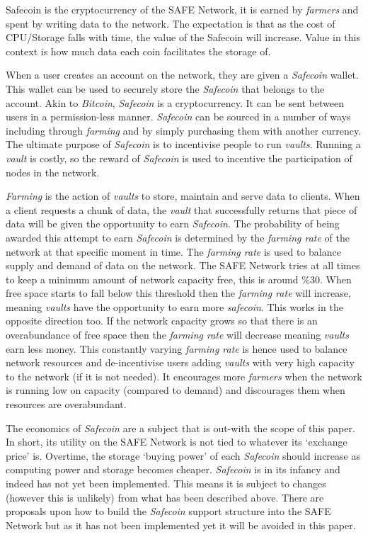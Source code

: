 Safecoin\cite{lambert2015safecoin} is the cryptocurrency of the SAFE Network, it is earned by \textit{farmers} and spent by writing data to the network. The expectation is that as the cost of CPU/Storage falls with time, the value of the Safecoin will increase. Value in this context is how much data each coin facilitates the storage of.

When a user creates an account on the network, they are given a \textit{Safecoin} wallet. This wallet can be used to securely store the \textit{Safecoin} that belongs to the account. Akin to \textit{Bitcoin}, \textit{Safecoin} is a cryptocurrency. It can be sent between users in a permission-less manner. \textit{Safecoin} can be sourced in a number of ways including through \textit{farming} and by simply purchasing them with another currency. The ultimate purpose of \textit{Safecoin} is to incentivise people to run \textit{vaults}. Running a \textit{vault} is costly, so the reward of \textit{Safecoin} is used to incentive the participation of nodes in the network.

\textit{Farming} is the action of \textit{vaults} to store, maintain and serve data to clients. When a client requests a chunk of data, the \textit{vault} that successfully returns that piece of data will be given the opportunity to earn \textit{Safecoin}. The probability of being awarded this attempt to earn \textit{Safecoin} is determined by the \textit{farming rate} of the network at that specific moment in time. The \textit{farming rate} is used to balance supply and demand of data on the network. The SAFE Network tries at all times to keep a minimum amount of network capacity free, this is around \%30. When free space starts to fall below this threshold then the \textit{farming rate} will increase, meaning \textit{vaults} have the opportunity to earn more \textit{safecoin}. This works in the opposite direction too. If the network capacity grows so that there is an overabundance of free space then the \textit{farming rate} will decrease meaning \textit{vaults} earn less money. This constantly varying \textit{farming rate} is hence used to balance network resources and de-incentivise users adding \textit{vaults} with very high capacity to the network (if it is not needed). It encourages more \textit{farmers} when the network is running low on capacity (compared to demand) and discourages them when resources are overabundant.

The economics of \textit{Safecoin} are a subject that is out-with the scope of this paper. In short, its utility on the SAFE Network is not tied to whatever its `exchange price' is. Overtime, the storage `buying power' of each \textit{Safecoin} should increase as computing power and storage becomes cheaper. \textit{Safecoin} is in its infancy and indeed has not yet been implemented. This means it is subject to changes (however this is unlikely) from what has been described above. There are proposals upon how to build the \textit{Safecoin} support structure into the SAFE Network but as it has not been implemented yet it will be avoided in this paper.

